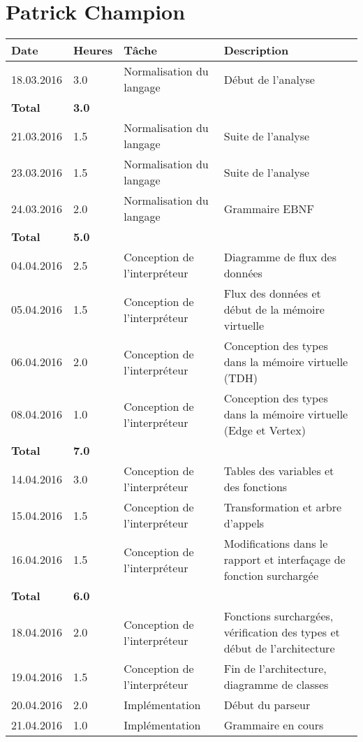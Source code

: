 \documentclass[french]{article}
\begin{document}
	\section*{Patrick Champion}
	\begin{longtable}{p{}|p{}|p{}|p{}}
		Date & Heures & Tâche & Description\\ 
		\hline \hline
		18.03.2016 & 3.0 & Normalisation du langage & Début de l'analyse\\ 
		\textbf{Total} & \textbf{3.0} &&\\
		\hline
		21.03.2016 & 1.5 & Normalisation du langage & Suite de l'analyse\\
		23.03.2016 & 1.5 & Normalisation du langage & Suite de l'analyse\\
		24.03.2016 & 2.0 & Normalisation du langage & Grammaire EBNF\\  
		\textbf{Total} & \textbf{5.0} &&\\
		\hline
		04.04.2016 & 2.5 & Conception de l'interpréteur & Diagramme de flux des données\\
		05.04.2016 & 1.5 & Conception de l'interpréteur & Flux des données et début de la mémoire virtuelle\\
		06.04.2016 & 2.0 & Conception de l'interpréteur & Conception des types dans la mémoire virtuelle (TDH)\\
		08.04.2016 & 1.0 & Conception de l'interpréteur & Conception des types dans la mémoire virtuelle (Edge et Vertex)\\   
		\textbf{Total} & \textbf{7.0} &&\\
		\hline
		14.04.2016 & 3.0 & Conception de l'interpréteur & Tables des variables et des fonctions\\
		15.04.2016 & 1.5 & Conception de l'interpréteur & Transformation et arbre d'appels\\
		16.04.2016 & 1.5 & Conception de l'interpréteur & Modifications dans le rapport et interfaçage de fonction surchargée\\   
		\textbf{Total} & \textbf{6.0} &&\\
		\hline
		18.04.2016 & 2.0 & Conception de l'interpréteur & Fonctions surchargées, vérification des types et début de l'architecture\\
		19.04.2016 & 1.5 & Conception de l'interpréteur & Fin de l'architecture, diagramme de classes\\ 
		20.04.2016 & 2.0 & Implémentation & Début du parseur\\
		21.04.2016 & 1.0 & Implémentation & Grammaire en cours\\

\end{longtable}
\end{document}
